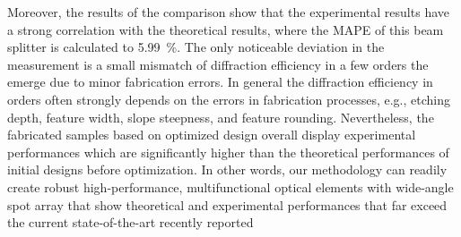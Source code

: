 Moreover, the results of the comparison show that the experimental results have a strong correlation with the theoretical results, where the MAPE of this beam splitter is calculated to \SI{5.99}{\percent}.
The only noticeable deviation in the measurement is a small mismatch of diffraction efficiency in a few orders the emerge due to minor fabrication errors. 
In general the diffraction efficiency in orders often strongly depends on the errors in fabrication processes, e.g., etching depth, feature width, slope steepness, and feature rounding.
Nevertheless, the fabricated samples based on optimized design overall display experimental performances which are significantly higher than the theoretical performances of initial designs before optimization.
In other words, our methodology can readily create robust high-performance, multifunctional optical elements with wide-angle spot array that show theoretical and experimental performances that far exceed the current state-of-the-art recently reported %